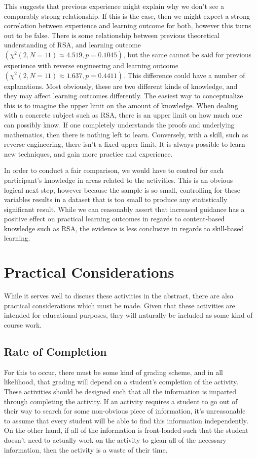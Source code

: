         This suggests that previous experience might explain why we don't see a comparably strong relationship. %
If this is the case, then we might expect a strong correlation between experience and learning outcome for both, however this turns out to be false. %
There is some relationship between previous theoretical understanding of RSA, and learning outcome $(\chi^2(2, N=11)\approx4.519,  p = 0.1045)$, but the same cannot be said for previous experience with reverse engineering and learning outcome $(\chi^2(2, N=11)\approx1.637,  p = 0.4411)$. %
This difference could have a number of explanations. %
Most obviously, these are two different kinds of knowledge, and they may affect learning outcomes differently. %
The easiest way to conceptualize this is to imagine the upper limit on the amount of knowledge. %
When dealing with a concrete subject such as RSA, there is an upper limit on how much one can possibly know. %
If one completely understands the proofs and underlying mathematics, then there is nothing left to learn. %
Conversely, with a skill, such as reverse engineering, there isn't a fixed upper limit. %
It is always possible to learn new techniques, and gain more practice and experience. 

        In order to conduct a fair comparison, we would have to control for each participant's knowledge in areas related to the activities. %
This is an obvious logical next step, however because the sample is so small, controlling for these variables results in a dataset that is too small to produce any statistically significant result. %
While we can reasonably assert that increased guidance has a positive effect on practical learning outcomes in regards to content-based knowledge such as RSA, the evidence is less conclusive in regards to skill-based learning. 

        
\section{Practical Considerations}
    While it serves well to discuss these activities in the abstract, there are also practical considerations which must be made. %
Given that these activities are intended for educational purposes, they will naturally be included as some kind of course work.

    \subsection{Rate of Completion}
         For this to occur, there must be some kind of grading scheme, and in all likelihood, that grading will depend on a student's completion of the activity. %
These activities should be designed such that all the information is imparted through completing the activity. %
If an activity requires a student to go out of their way to search for some non-obvious piece of information, it's unreasonable to assume that every student will be able to find this information independently. %
On the other hand, if all of the information is front-loaded such that the student doesn't need to actually work on the activity to glean all of the necessary information, then the activity is a waste of their time. 

